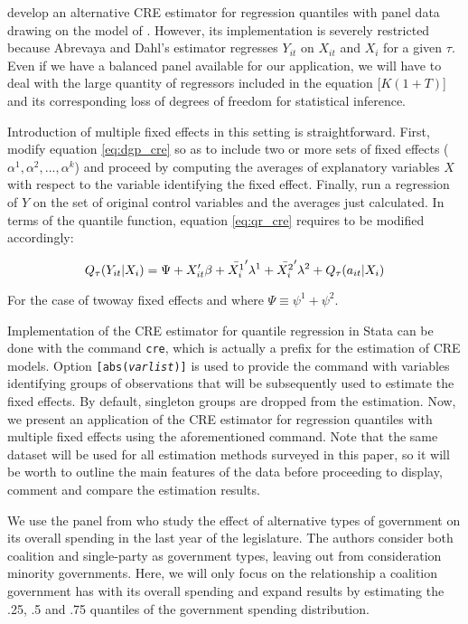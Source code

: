 \documentclass[bib]{statapress}
\begin{document}
\citep{abrevaya2008} develop an alternative CRE estimator for regression
quantiles with panel data drawing on the model of
\citep{chamberlain1982}. However, its implementation is severely
restricted because Abrevaya and Dahl's estimator regresses \(Y_{it}\) on
\(X_{it}\) and \(X_{i}\) for a given \(\tau\). Even if we have a
balanced panel available for our application, we will have to deal with
the large quantity of regressors included in the equation
{[}\(K(1+T)\){]} and its corresponding loss of degrees of freedom for
statistical inference.

Introduction of multiple fixed effects in this setting is
straightforward. First, modify equation
\hyperref[eq:dgp_cre]{{[}eq:dgp\_cre{]}} so as to include two or more
sets of fixed effects (\(\alpha^1, \alpha^2, ..., \alpha^k\)) and
proceed by computing the averages of explanatory variables \(X\) with
respect to the variable identifying the fixed effect. Finally, run a
regression of \(Y\) on the set of original control variables and the
averages just calculated. In terms of the quantile function, equation
\hyperref[eq:qr_cre]{{[}eq:qr\_cre{]}} requires to be modified
accordingly:

\[\label{eq:qr_cre_twoway}
    Q_{\tau}(Y_{it} | X_i) = \Psi + X_{it}' \beta + \Bar{X^1_i}' \lambda^1 + \Bar{X^2_i}' \lambda^2 + Q_{\tau}(a_{it} | X_i)\]

For the case of twoway fixed effects and where
\(\Psi \equiv \psi^1 + \psi^2\).

Implementation of the CRE estimator for quantile regression in Stata can
be done with the command \texttt{cre}, which is actually a prefix for
the estimation of CRE models. Option
\texttt{{[}abs(}\emph{\texttt{varlist}}\texttt{){]}} is used to provide
the command with variables identifying groups of observations that will
be subsequently used to estimate the fixed effects. By default,
singleton groups are dropped from the estimation. Now, we present an
application of the CRE estimator for regression quantiles with multiple
fixed effects using the aforementioned command. Note that the same
dataset will be used for all estimation methods surveyed in this paper,
so it will be worth to outline the main features of the data before
proceeding to display, comment and compare the estimation results.

We use the panel from \citep{persson2007} who study the effect of
alternative types of government on its overall spending in the last year
of the legislature. The authors consider both coalition and single-party
as government types, leaving out from consideration minority
governments. Here, we will only focus on the relationship a coalition
government has with its overall spending and expand \citep{persson2007}
results by estimating the .25, .5 and .75 quantiles of the government
spending distribution.
\end{document}
